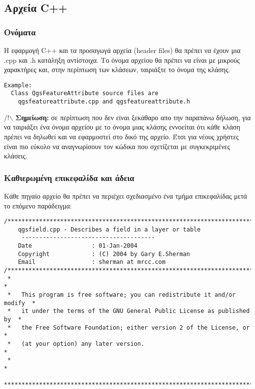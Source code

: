 \hypertarget{toc10}{}
\subsection{Αρχεία C++}
\hypertarget{toc11}{}
\subsubsection{Ονόματα}
Η εφαρμογή C++ και τα προσαγωγά αρχεία (header files) θα πρέπει να έχουν μια .cpp και .h κατάληξη αντίστοιχα. Το όνομα αρχείου θα πρέπει να είναι με μικρούς χαρακτήρες και, στην περίπτωση των κλάσεων, ταιριάξτε το όνομα της κλάσης.

\begin{verbatim}
Example:
  Class QgsFeatureAttribute source files are 
    qgsfeatureattribute.cpp and qgsfeatureattribute.h
\end{verbatim}

/!$\backslash$ \textbf{Σημείωση:} σε περίπτωση που δεν είναι ξεκάθαρο απο την παραπάνω δήλωση, για να ταιριάξει ένα όνομα αρχείου με το όνομα μιας κλάσης εννοείται ότι κάθε κλάση πρέπει να δηλωθεί και να εφαρμοστεί στο δικό της αρχείο. Έτσι για νέους χρήστες είναι πιο εύκολο να αναγνωρίσουν τον κώδικα που σχετίζεται με συγκεκριμένες κλάσεις.

\hypertarget{toc12}{}
\subsubsection{Καθιερωμένη επικεφαλίδα και άδεια}
Κάθε πηγαίο αρχείο θα πρέπει να περιέχει σχεδιασμένο ένα τμήμα επικεφαλίδας μετά το επόμενο παράδειγμα:

\begin{verbatim}
/***************************************************************************
    qgsfield.cpp - Describes a field in a layer or table
     --------------------------------------
    Date                 : 01-Jan-2004
    Copyright            : (C) 2004 by Gary E.Sherman
    Email                : sherman at mrcc.com
/***************************************************************************
 *                                                                         *
 *   This program is free software; you can redistribute it and/or modify  *
 *   it under the terms of the GNU General Public License as published by  *
 *   the Free Software Foundation; either version 2 of the License, or     *
 *   (at your option) any later version.                                   *
 *                                                                         *
 ***************************************************************************/
\end{verbatim}

